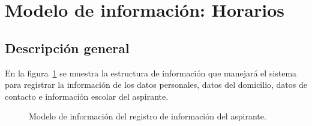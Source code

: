 \newpage

\section{Modelo de información: Horarios}

\subsection{Descripción general}

En la figura~\ref{fig:registroInfoAspirante} se muestra la estructura de información que manejará el sistema para registrar la información de los datos personales, datos del domicilio, datos de contacto e información escolar del aspirante.

\begin{figure}[htbp!]
	\begin{center}
		\caption{Modelo de información del registro de información del aspirante.}
		\label{fig:registroInfoAspirante}
	\end{center}
\end{figure}


